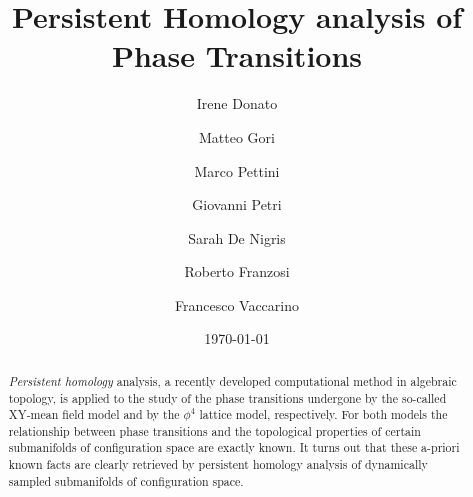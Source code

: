 \documentclass[preprintnumbers,showpacs, showkeys, twocolumn,secnumarabic,amssymb,amsmath,amsfonts,aps, pre]{revtex4-1}
\begin{document}
\everymath{\displaystyle}
\title{Persistent Homology analysis of  Phase Transitions}
\date{\today}
\author{Irene Donato}
\author{Matteo Gori}
\author{Marco Pettini}
\author{Giovanni Petri}
\author{Sarah De Nigris}
\author{Roberto Franzosi}
\author{Francesco Vaccarino}



\begin{abstract}
\textit{Persistent homology} analysis, a recently developed computational method in algebraic topology, is applied to the study of the phase transitions  undergone by the so-called XY-mean field model 
and by the $\phi^4$ lattice model, respectively.
For both models the relationship between phase transitions and the topological properties of certain submanifolds of configuration space are exactly known.
It turns out that these a-priori known facts are clearly retrieved by persistent homology analysis of dynamically sampled submanifolds of configuration space.
\end{abstract}
\maketitle
\end{document}

